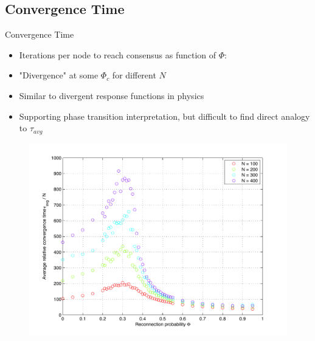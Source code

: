 \documentclass[xcolor=x11names,compress]{beamer}
\renewcommand{\(}{\begin{columns}}
\renewcommand{\)}{\end{columns}}
\newcommand{\<}[1]{\begin{column}{#1}}
\renewcommand{\>}{\end{column}}
\begin{document}
\subsection{Convergence Time}
\begin{frame}{Convergence Time}

\begin{itemize}
\item Iterations per node to reach consensus as function of $\Phi$:
\item "Divergence" at some $\Phi_c$ for different $N$
\item Similar to divergent response functions in physics
\item Supporting phase transition interpretation, but difficult to find direct analogy to $\tau_{avg}$
\end{itemize}

\begin{figure}
    \includegraphics[scale=0.37]{Graphics/tau.pdf}
\end{figure}

\end{frame}

\end{document}
